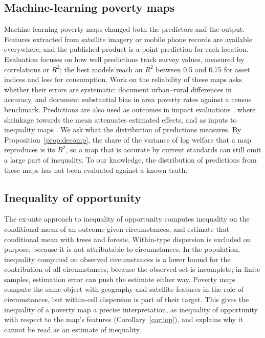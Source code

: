 \documentclass[pdflatex,sn-mathphys-ay]{sn-jnl}
\theoremstyle{thmstyleone}%
\theoremstyle{thmstyletwo}%
\theoremstyle{thmstylethree}%
\begin{document}
\subsection{Machine-learning poverty maps}\label{sec:lit_ml}
Machine-learning poverty maps changed both the predictors and the output. Features extracted from satellite imagery or mobile phone records \citep{jean2016,blumenstock2015,yeh2020,chi2022} are available everywhere, and the published product is a point prediction for each location. Evaluation focuses on how well predictions track survey values, measured by correlations or $R^2$; the best models reach an $R^2$ between 0.5 and 0.75 for asset indices and less for consumption. Work on the reliability of these maps asks whether their errors are systematic: \citet{aiken2023} document urban--rural differences in accuracy, and \citet{corral2025} document substantial bias in area poverty rates against a census benchmark. Predictions are also used as outcomes in impact evaluations \citep{ratledge2022}, where shrinkage towards the mean attenuates estimated effects, and as inputs to inequality maps \citep{pradhan2025}. We ask what the distribution of predictions measures. By Proposition~\ref{prop:decomp}, the share of the variance of log welfare that a map reproduces is its $R^2$, so a map that is accurate by current standards can still omit a large part of inequality. To our knowledge, the distribution of predictions from these maps has not been evaluated against a known truth.

\subsection{Inequality of opportunity}\label{sec:lit_iop}
The ex-ante approach to inequality of opportunity \citep{roemer1998,ferreira2011} computes inequality on the conditional mean of an outcome given circumstances, and \citet{brunori2023} estimate that conditional mean with trees and forests. Within-type dispersion is excluded on purpose, because it is not attributable to circumstances. In the population, inequality computed on observed circumstances is a lower bound for the contribution of all circumstances, because the observed set is incomplete; in finite samples, estimation error can push the estimate either way. Poverty maps compute the same object with geography and satellite features in the role of circumstances, but within-cell dispersion is part of their target. This gives the inequality of a poverty map a precise interpretation, as inequality of opportunity with respect to the map's features (Corollary~\ref{cor:iop}), and explains why it cannot be read as an estimate of inequality.
\end{document}
